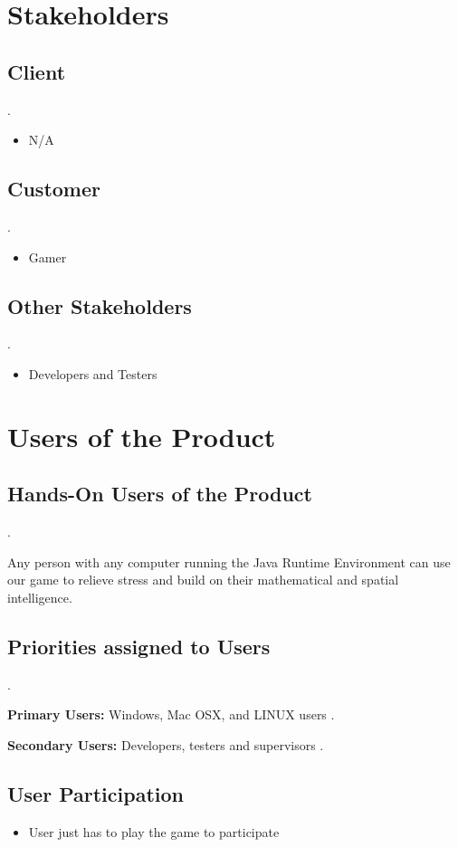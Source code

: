 \documentclass[12pt]{article}
\begin{document}
\section{Stakeholders}
\subsection{Client}
.\par
\begin{itemize}
\item N/A
\end{itemize}
\subsection{Customer}
.\par
\begin{itemize}
\item Gamer
\end{itemize}
\subsection{Other Stakeholders}
.\par
\begin{itemize}
\item Developers and Testers
\end{itemize}

\section{Users of the Product}
\subsection{Hands-On Users of the Product}
.\par
Any person with any computer running the Java Runtime Environment can use our game to relieve stress and build on their mathematical and spatial intelligence. 
\subsection{Priorities assigned to Users}
.\par
\textbf{Primary Users:} Windows, Mac OSX, and LINUX users
.\par
\textbf{Secondary Users:} Developers, testers and supervisors
.\par
\subsection{User Participation}
\begin{itemize}
\item User just has to play the game to participate
\end{itemize}
\end{document}
